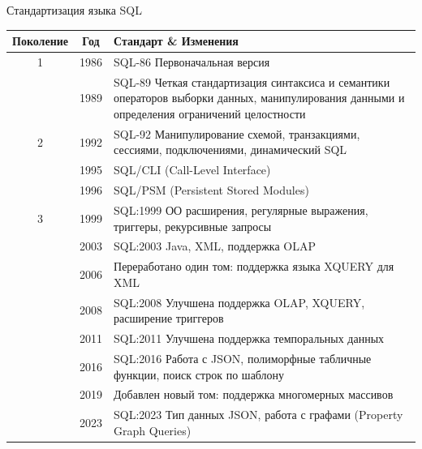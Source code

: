 \documentclass[a4paper,12pt]{article}
\begin{document}
Стандартизация языка SQL  
\begin{tabular}{c|c|l}
Поколение & Год & Стандарт \& Изменения \\ \hline
1 & 1986 & SQL-86 Первоначальная версия \\ 
  & 1989 & SQL-89 Четкая стандартизация синтаксиса и семантики операторов выборки данных, манипулирования данными и определения ограничений целостности \\
2 & 1992 & SQL-92 Манипулирование схемой, транзакциями, сессиями, подключениями, динамический SQL \\
  & 1995 & SQL/CLI (Call-Level Interface) \\
  & 1996 & SQL/PSM (Persistent Stored Modules) \\
3 & 1999 & SQL:1999 ОО расширения, регулярные выражения, триггеры, рекурсивные запросы \\
  & 2003 & SQL:2003 Java, XML, поддержка OLAP \\
  & 2006 & Переработано один том: поддержка языка XQUERY для XML \\
  & 2008 & SQL:2008 Улучшена поддержка OLAP, XQUERY, расширение триггеров \\
  & 2011 & SQL:2011 Улучшена поддержка темпоральных данных \\
  & 2016 & SQL:2016 Работа с JSON, полиморфные табличные функции, поиск строк по шаблону \\
  & 2019 & Добавлен новый том: поддержка многомерных массивов \\
  & 2023 & SQL:2023 Тип данных JSON, работа с графами (Property Graph Queries)
\end{tabular}
\end{document}
